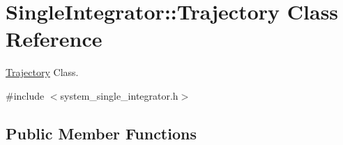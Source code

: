 \hypertarget{class_single_integrator_1_1_trajectory}{\section{Single\-Integrator\-:\-:Trajectory Class Reference}
\label{class_single_integrator_1_1_trajectory}
}


\hyperlink{class_single_integrator_1_1_trajectory}{Trajectory} Class.  




{\ttfamily \#include $<$system\-\_\-single\-\_\-integrator.\-h$>$}

\subsection*{Public Member Functions}
